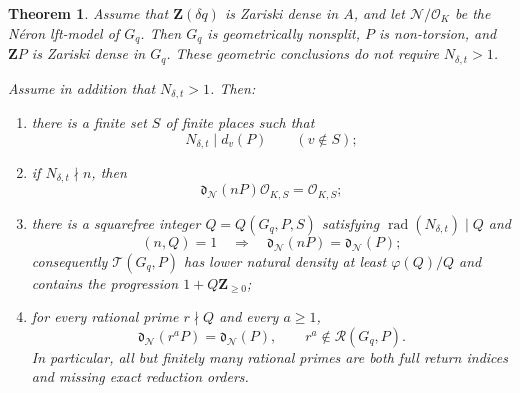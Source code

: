 \documentclass[11pt,letterpaper,reqno]{amsart}
\newtheorem{theorem}{Theorem}[section]
\theoremstyle{definition}
\theoremstyle{remark}
\newcommand{\Z}{\mathbf Z}
\newcommand{\OK}{\mathcal O_K}
\newcommand{\rad}{\operatorname{rad}}
\newcommand{\dd}{\mathfrak d}
\newcommand{\cO}{\mathcal O}
\newcommand{\Ner}{\mathcal N}
\begin{document}
\begin{theorem}
\label{thm:main}
Assume that $\mathbf Z(\delta q)$ is Zariski dense in $A$, and let
$\Ner/\OK$ be the N\'eron lft-model of $G_q$.  Then $G_q$ is geometrically
nonsplit, $P$ is non-torsion, and $\mathbf ZP$ is Zariski dense in $G_q$.
These geometric conclusions do not require $N_{\delta,t}>1$.

Assume in addition that $N_{\delta,t}>1$.  Then:
\begin{enumerate}[label=\textup{(\roman*)}]
\item there is a finite set $S$ of finite places such that
\begin{equation}\label{eq:N-divides-orders}
 N_{\delta,t}\mid d_v(P)\qquad(v\notin S);
\end{equation}
\item if $N_{\delta,t}\nmid n$, then
\begin{equation}\label{eq:localized-blanking}
 \dd_{\Ner}(nP)\cO_{K,S}=\cO_{K,S};
\end{equation}
\item there is a squarefree integer $Q=Q(G_q,P,S)$ satisfying
$\rad(N_{\delta,t})\mid Q$ and
\begin{equation}\label{eq:global-coprime-return}
 (n,Q)=1
 \quad\Longrightarrow\quad
 \dd_{\Ner}(nP)=\dd_{\Ner}(P);
\end{equation}
consequently $\mathscr T(G_q,P)$ has lower natural density at least
$\varphi(Q)/Q$ and contains the progression $1+Q\Z_{\ge0}$;
\item for every rational prime $r\nmid Q$ and every $a\ge1$,
\begin{equation}\label{eq:prime-power-return}
 \dd_{\Ner}(r^{a}P)=\dd_{\Ner}(P),
 \qquad
 r^a\notin\mathscr R(G_q,P).
\end{equation}
In particular, all but finitely many rational primes are both full return
indices and missing exact reduction orders.
\end{enumerate}
\end{theorem}
\end{document}
